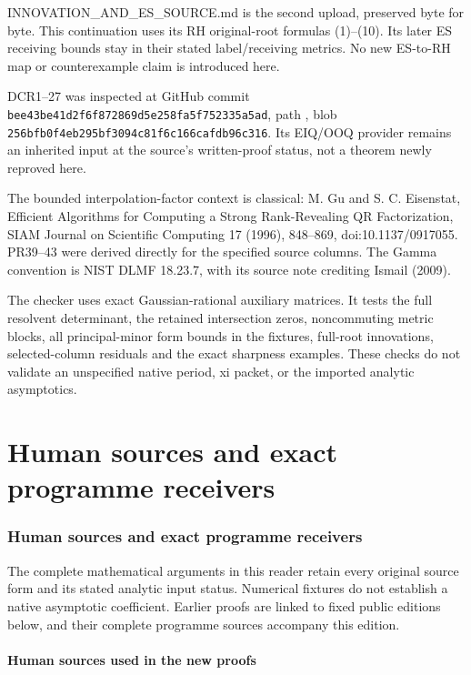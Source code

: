 \documentclass[11pt]{article}
\begin{document}
INNOVATION\_AND\_ES\_SOURCE.md is the second upload, preserved byte for byte. This continuation uses its RH original-root formulas (1)--(10). Its later ES receiving bounds stay in their stated label/receiving metrics. No new ES-to-RH map or counterexample claim is introduced here.

DCR1--27 was inspected at GitHub commit \nolinkurl{bee43be41d2f6f872869d5e258fa5f752335a5ad}, path , blob \nolinkurl{256bfb0f4eb295bf3094c81f6c166cafdb96c316}. Its EIQ/OOQ provider remains an inherited input at the source's written-proof status, not a theorem newly reproved here.

The bounded interpolation-factor context is classical: M. Gu and S. C. Eisenstat, Efficient Algorithms for Computing a Strong Rank-Revealing QR Factorization, SIAM Journal on Scientific Computing 17 (1996), 848--869, doi:10.1137/0917055. PR39--43 were derived directly for the specified source columns. The Gamma convention is NIST DLMF 18.23.7, with its source note crediting Ismail (2009).

The checker uses exact Gaussian-rational auxiliary matrices. It tests the full resolvent determinant, the retained intersection zeros, noncommuting metric blocks, all principal-minor form bounds in the fixtures, full-root innovations, selected-column residuals and the exact sharpness examples. These checks do not validate an unspecified native period, xi packet, or the imported analytic asymptotics.

\clearpage\part{Human sources and exact programme receivers}
\section{Human sources and exact programme receivers}\label{human-sources-and-exact-programme-receivers}

The complete mathematical arguments in this reader retain every original source form and its stated analytic input status. Numerical fixtures do not establish a native asymptotic coefficient. Earlier proofs are linked to fixed public editions below, and their complete programme sources accompany this edition.

\subsection{Human sources used in the new proofs}\label{human-sources-used-in-the-new-proofs}
\end{document}
